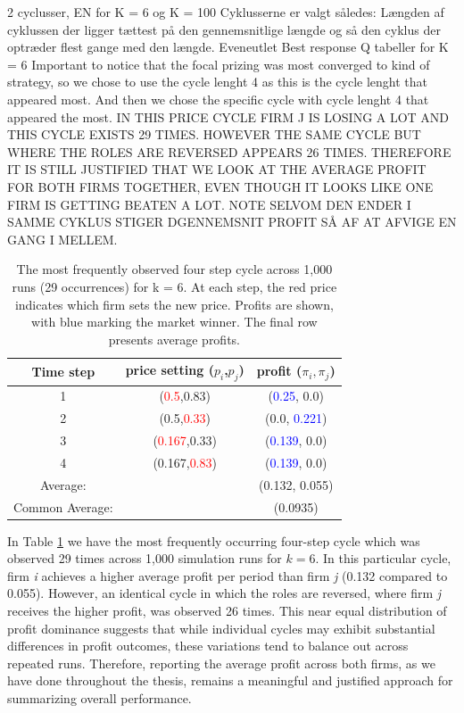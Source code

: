 \documentclass{article}
\begin{document}
2 cyclusser, EN for K = 6  og  K = 100
Cyklusserne er valgt således:
Længden af cyklussen der ligger tættest på den gennemsnitlige længde og så den cyklus der optræder flest gange med den længde. 
Eveneutlet Best response Q tabeller for K = 6 
Important to notice that the focal prizing was most converged to kind of strategy, so we chose to use the cycle lenght 4 as this is the cycle lenght that appeared most. And then we chose the specific cycle with cycle lenght 4 that appeared the most. 
IN THIS PRICE CYCLE FIRM J IS LOSING A LOT AND THIS CYCLE EXISTS 29 TIMES. HOWEVER THE SAME CYCLE BUT WHERE THE ROLES ARE REVERSED APPEARS 26 TIMES. THEREFORE IT IS STILL JUSTIFIED THAT WE LOOK AT THE AVERAGE PROFIT FOR BOTH FIRMS TOGETHER, EVEN THOUGH IT LOOKS LIKE ONE FIRM IS GETTING BEATEN A LOT.
NOTE SELVOM DEN ENDER I SAMME CYKLUS STIGER DGENNEMSNIT PROFIT SÅ AF AT AFVIGE EN GANG I MELLEM.
\begin{table}[H]
    \centering
    \begin{tabular}{|c|c|c|}
        \hline
        Time step & price setting ($p_i$,$p_j$) &  profit ($\pi_i,\pi_j$) \\
        \hline
        1 & (\textcolor{red}{0.5},0.83) & (\textcolor{blue}{0.25}, 0.0)  \\
        \hline
        2 & (0.5,\textcolor{red}{0.33}) & (0.0, \textcolor{blue}{0.221}) \\
        \hline
        3 & (\textcolor{red}{0.167},0.33) & (\textcolor{blue}{0.139}, 0.0)  \\
        \hline
        4 & (0.167,\textcolor{red}{0.83}) & (\textcolor{blue}{0.139}, 0.0)  \\
        \hline
        Average: & & (0.132, 0.055) \\
         \hline
        Common Average: & & (0.0935) \\
         \hline
    \end{tabular}
    \caption{The most frequently observed four step cycle across 1,000 runs (29 occurrences) for k = 6. At each step, the red price indicates which firm sets the new price. Profits are shown, with blue marking the market winner. The final row presents average profits.}
    \label{tab:PriceCycleLen4}
\end{table}
In Table \ref{tab:PriceCycleLen4} we have the most frequently occurring four-step cycle which was observed 29 times across 1,000 simulation runs for $k = 6$. In this particular cycle, firm \textit{i} achieves a higher average profit per period than firm \textit{j} (0.132 compared to 0.055). However, an identical cycle in which the roles are reversed, where firm \textit{j} receives the higher profit, was observed 26 times. This near equal distribution of profit dominance suggests that while individual cycles may exhibit substantial differences in profit outcomes, these variations tend to balance out across repeated runs. Therefore, reporting the average profit across both firms, as we have done throughout the thesis, remains a meaningful and justified approach for summarizing overall performance.
\end{document}
